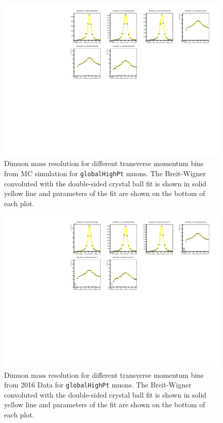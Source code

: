\begin{figure}[tph]
  \centering
  \includegraphics[width=.9\textwidth]{fig/MomentumResolution/2016_ZPeakResoultion_G_Fits_MC.pdf}
  \caption{Dimuon mass resolution for different transverse momentum bins from MC
    simulation for \texttt{globalHighPt} muons. The Breit-Wigner convoluted with the
    double-sided crystal ball fit is shown in solid yellow line and parameters
    of the fit are shown on the bottom of each plot.}
  \label{fig:ZMassResolution_MC_Global}
\end{figure}

\begin{figure}[tph]
  \centering
  \includegraphics[width=.9\textwidth]{fig/MomentumResolution/2016_ZPeakResolution_G_Fits_Data.pdf}
  \caption{Dimuon mass resolution for different transverse momentum bins from 2016
    Data for \texttt{globalHighPt} muons. The Breit-Wigner convoluted with the
    double-sided crystal ball fit is shown in solid yellow line and parameters
    of the fit are shown on the bottom of each plot.}
  \label{fig:ZMassResolution_Data_Global}
\end{figure}

